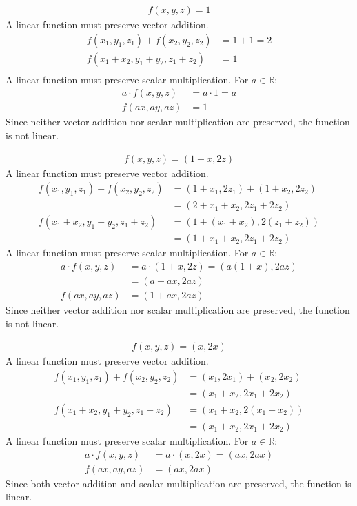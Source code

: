 \documentclass{article}
\begin{document}
\begin{align*}
    f(x, y, z) = 1
\end{align*}
A linear function must preserve vector addition.
\begin{align*}
    f(x_1, y_1, z_1) + f(x_2, y_2, z_2) & = 1 + 1 = 2 \\
    f(x_1 + x_2, y_1 + y_2, z_1 + z_2) & = 1 \\
\end{align*}
A linear function must preserve scalar multiplication. For $a \in \mathbb{R}$:
\begin{align*}
    a \cdot f(x, y, z) & = a \cdot 1 = a \\
    f(ax, ay, az) & = 1
\end{align*}
Since neither vector addition nor scalar multiplication are preserved, the function is not linear.

\begin{align*}
    f(x, y, z) = (1 + x, 2z)
\end{align*}
A linear function must preserve vector addition.
\begin{align*}
    f(x_1, y_1, z_1) + f(x_2, y_2, z_2) & = (1 + x_1, 2z_1) + (1 + x_2, 2z_2) \\
    & = (2 + x_1 + x_2, 2z_1 + 2z_2) \\
    f(x_1 + x_2, y_1 + y_2, z_1 + z_2) & = (1 + (x_1 + x_2), 2(z_1 + z_2)) \\
    & = (1 + x_1 + x_2, 2z_1 + 2z_2)
\end{align*}
A linear function must preserve scalar multiplication. For $a \in \mathbb{R}$:
\begin{align*}
    a \cdot f(x, y, z) & = a \cdot (1 + x, 2z) = (a(1 + x), 2az) \\
    & = (a + ax, 2az) \\
    f(ax, ay, az) & = (1 + ax, 2az)
\end{align*}
Since neither vector addition nor scalar multiplication are preserved, the function is not linear.

\begin{align*}
    f(x, y, z) = (x, 2x)
\end{align*}
A linear function must preserve vector addition.
\begin{align*}
    f(x_1, y_1, z_1) + f(x_2, y_2, z_2) & = (x_1, 2x_1) + (x_2, 2x_2) \\
    & = (x_1 + x_2, 2x_1 + 2x_2) \\
    f(x_1 + x_2, y_1 + y_2, z_1 + z_2) & = (x_1 + x_2, 2(x_1 + x_2)) \\
    & = (x_1 + x_2, 2x_1 + 2x_2)
\end{align*}
A linear function must preserve scalar multiplication. For $a \in \mathbb{R}$:
\begin{align*}
    a \cdot f(x, y, z) & = a \cdot (x, 2x) = (ax, 2ax) \\
    f(ax, ay, az) & = (ax, 2ax)
\end{align*}
Since both vector addition and scalar multiplication are preserved, the function is linear.
\end{document}
